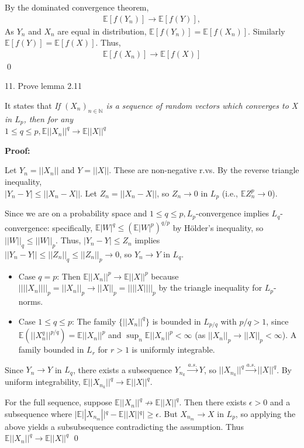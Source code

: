 \documentclass[10pt]{article}
\begin{document}
By the dominated convergence theorem,
\begin{gather*}
    \mathbb{E}[f(Y_n)] \to \mathbb{E}[f(Y)],
\end{gather*}
As $Y_n$ and $X_n$ are equal in distribution, $\mathbb{E}[f(Y_n)] = \mathbb{E}[f(X_n)]$. Similarly $\mathbb{E}[f(Y)] = \mathbb{E}[f(X)]$. Thus,
\begin{gather*}
    \mathbb{E}[f(X_n)] \to \mathbb{E}[f(X)]
\end{gather*}
\qed 

11. Prove lemma 2.11

It states that \textit{If $(X_n)_{n \in \mathbb{N}}$ is a sequence of random vectors which converges to X in $L_{p}$, then for any \\ $1 \le q \le p, \mathbb{E}||X_n||^q \to \mathbb{E}||X||^q$}

\textbf{Proof:}

Let $Y_n = ||X_n||$ and $Y = ||X||$. These are non-negative r.vs. By the reverse triangle inequality, \\$|Y_n - Y| \le ||X_n - X||$. Let $Z_n = ||X_n - X||$, so $Z_n \to 0$ in $L_p$ (i.e., $\mathbb{E}Z_n^p \to 0$).

Since we are on a probability space and $1 \le q \le p, L_p$-convergence implies $L_q$-convergence: specifically, $\mathbb{E}|W|^q \le (\mathbb{E}|W|^p)^{q/p}$ by Hölder's inequality, so $||W||_q \le ||W||_p$. Thus, $|Y_n - Y| \le Z_n$ implies \\$||Y_n - Y|| \le ||Z_n||_q \le ||Z_n||_p \to 0$, so $Y_n \to Y$ in $L_q$.

\begin{itemize}
    \item Case $q = p$: Then $\mathbb{E}||X_n||^p \to \mathbb{E}||X||^p$ because $|| ||X_n|| ||_p = ||X_n||_p \to ||X||_p = || ||X|| ||_p$ by the triangle inequality for $L_p$-norms.
    \item Case $1 \le q \le p$: The family $\{||X_n||^q\}$ is bounded in $L_{p/q}$ with $p/q > 1$, since $\mathbb{E}(||X_n^q||^{p/q}) = \mathbb{E}||X_n||^p$ and $\sup_n \mathbb{E}||X_n||^p < \infty$ (as $||X_n||_p \to ||X||_p < \infty$). A family bounded in $L_r$ for $r > 1$ is uniformly integrable.
\end{itemize}

Since $Y_n \to Y$ in $L_q$, there exists a subsequence $Y_{n_k} \xrightarrow{a.s.} Y$, so $||X_{n_k}||^q \xrightarrow{a.s.}||X||^q$. By uniform integrability, $\mathbb{E}||X_{n_k}||^q \to \mathbb{E}||X||^q$.

For the full sequence, suppose $\mathbb{E}||X_n||^q \not \to \mathbb{E}||X||^q$. Then there exists $\epsilon > 0$ and a subsequence where $|\mathbb{E}||X_{n_m}||^q - \mathbb{E}||X||^q| \ge \epsilon$. But $X_{n_m} \to X$ in $L_p$, so applying the above yields a subsubsequence contradicting the assumption. Thus $\mathbb{E}||X_n||^q \to \mathbb{E}||X||^q$ \qed
\end{document}
